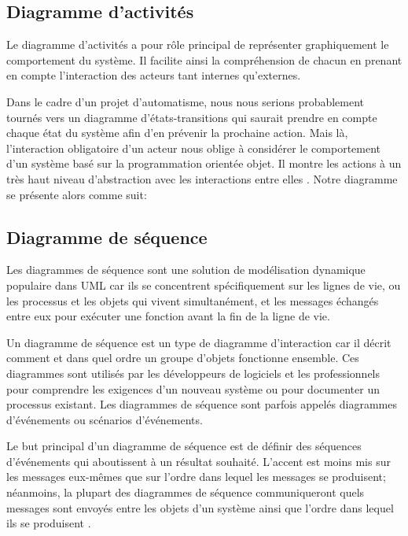     \subsection{Diagramme d'activités}
    Le diagramme d'activités a pour rôle principal de représenter graphiquement 
    le comportement du système. Il facilite ainsi la compréhension de chacun en prenant 
    en compte l'interaction des acteurs tant internes qu'externes. 
    \par 
    Dans le cadre d'un projet d'automatisme, nous nous serions probablement tournés vers un 
    diagramme d'états-transitions qui saurait prendre en compte chaque état du système afin d'en prévenir
    la prochaine action. Mais là, l'interaction obligatoire d'un acteur nous oblige à 
    considérer le comportement d'un système basé sur la programmation orientée objet. Il 
    montre les actions à un très haut niveau d’abstraction avec les interactions entre elles \cite{conan2015introduction}. 
    Notre diagramme se présente alors comme suit:
    

    \subsection{Diagramme de séquence}
    Les diagrammes de séquence sont une solution de modélisation 
    dynamique populaire dans UML car ils se concentrent spécifiquement 
    sur les lignes de vie, ou les processus et les objets qui vivent 
    simultanément, et les messages échangés entre eux pour exécuter 
    une fonction avant la fin de la ligne de vie. 
    \par
    Un diagramme de séquence est un type de diagramme d'interaction car 
    il décrit comment et dans quel ordre un groupe d'objets fonctionne 
    ensemble. Ces diagrammes sont utilisés par les développeurs de 
    logiciels et les professionnels pour comprendre les exigences 
    d'un nouveau système ou pour documenter un processus existant. 
    Les diagrammes de séquence sont parfois appelés diagrammes d'événements 
    ou scénarios d'événements.
    \par 
    Le but principal d'un diagramme de séquence est de définir des séquences 
    d'événements qui aboutissent à un résultat souhaité. L'accent est moins mis 
    sur les messages eux-mêmes que sur l'ordre dans lequel les messages se produisent; 
    néanmoins, la plupart des diagrammes de séquence communiqueront quels messages sont 
    envoyés entre les objets d’un système ainsi que l’ordre dans lequel ils se 
    produisent \cite{citeseqdiag}.

